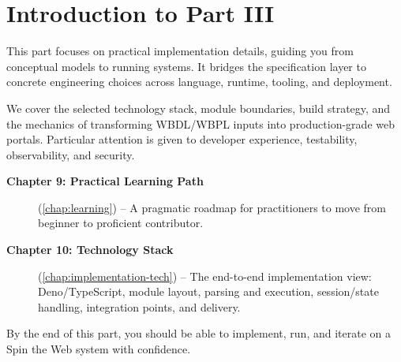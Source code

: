 
\chapter*{Introduction to Part III}
\label{part:implementation}

This part focuses on practical implementation details, guiding you from conceptual models to running systems. It bridges the specification layer to concrete engineering choices across language, runtime, tooling, and deployment.

We cover the selected technology stack, module boundaries, build strategy, and the mechanics of transforming WBDL/WBPL inputs into production-grade web portals. Particular attention is given to developer experience, testability, observability, and security.

\begin{description}
\item[\textbf{Chapter 9: Practical Learning Path}] (\cref{chap:learning}) -- A pragmatic roadmap for practitioners to move from beginner to proficient contributor.

 \item[\textbf{Chapter 10: Technology Stack}] (\cref{chap:implementation-tech}) -- The end-to-end implementation view: Deno/TypeScript, module layout, parsing and execution, session/state handling, integration points, and delivery.
\end{description}

By the end of this part, you should be able to implement, run, and iterate on a Spin the Web system with confidence.
